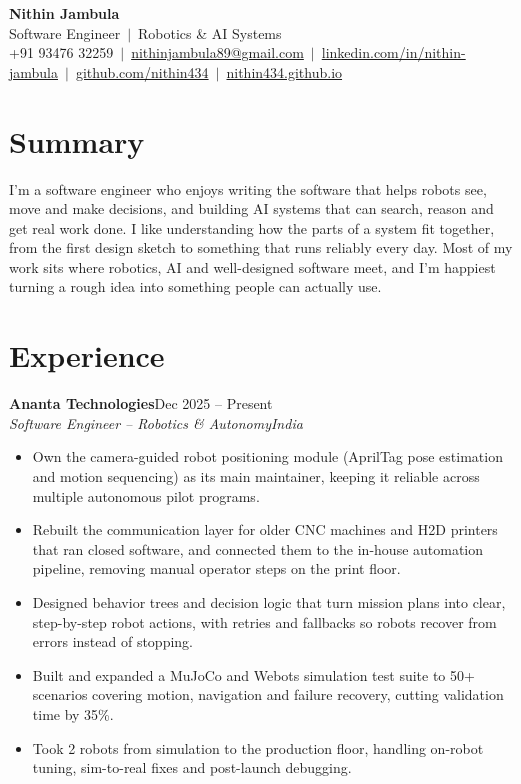 \documentclass[a4paper,10pt]{article}
\newcommand{\job}[4]{\textbf{#1}\hfill #2\\\textit{#3}\hfill\textit{#4}\par\vspace{-2pt}}
\newcommand{\gap}{\vspace{5pt}}
\begin{document}
\begin{center}
  {\color{accent}\Huge\textbf{Nithin Jambula}}\\[3pt]
  {\large Software Engineer \,$|$\, Robotics \& AI Systems}\\[4pt]
  \small
  +91 93476 32259 \,$|$\,
  \href{mailto:nithinjambula89@gmail.com}{nithinjambula89@gmail.com} \,$|$\,
  \href{https://linkedin.com/in/nithin-jambula}{linkedin.com/in/nithin-jambula} \,$|$\,
  \href{https://github.com/nithin434}{github.com/nithin434} \,$|$\,
  \href{https://nithin434.github.io}{nithin434.github.io}
\end{center}

\section{Summary}
I'm a software engineer who enjoys writing the software that helps robots see, move and make decisions, and building AI systems that can search, reason and get real work done.
I like understanding how the parts of a system fit together, from the first design sketch to something that runs reliably every day.
Most of my work sits where robotics, AI and well-designed software meet, and I'm happiest turning a rough idea into something people can actually use.

\section{Experience}

\job{Ananta Technologies}{Dec 2025 -- Present}{Software Engineer -- Robotics \& Autonomy}{India}
\begin{itemize}
  \item Own the camera-guided robot positioning module (AprilTag pose estimation and motion sequencing) as its main maintainer, keeping it reliable across multiple autonomous pilot programs.
  \item Rebuilt the communication layer for older CNC machines and H2D printers that ran closed software, and connected them to the in-house automation pipeline, removing manual operator steps on the print floor.
  \item Designed behavior trees and decision logic that turn mission plans into clear, step-by-step robot actions, with retries and fallbacks so robots recover from errors instead of stopping.
  \item Built and expanded a MuJoCo and Webots simulation test suite to 50+ scenarios covering motion, navigation and failure recovery, cutting validation time by 35\%.
  \item Took 2 robots from simulation to the production floor, handling on-robot tuning, sim-to-real fixes and post-launch debugging.
\end{itemize}
\gap
\end{document}
